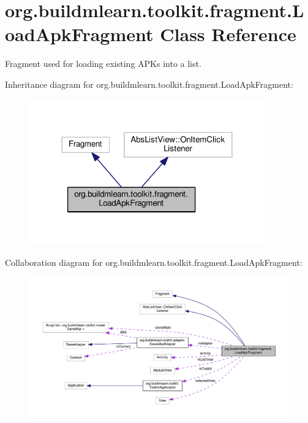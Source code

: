 \hypertarget{classorg_1_1buildmlearn_1_1toolkit_1_1fragment_1_1LoadApkFragment}{}\section{org.\+buildmlearn.\+toolkit.\+fragment.\+Load\+Apk\+Fragment Class Reference}
\label{classorg_1_1buildmlearn_1_1toolkit_1_1fragment_1_1LoadApkFragment}


Fragment used for loading existing A\+P\+Ks into a list.  




Inheritance diagram for org.\+buildmlearn.\+toolkit.\+fragment.\+Load\+Apk\+Fragment\+:
\nopagebreak
\begin{figure}[H]
\begin{center}
\leavevmode
\includegraphics[width=288pt]{classorg_1_1buildmlearn_1_1toolkit_1_1fragment_1_1LoadApkFragment__inherit__graph}
\end{center}
\end{figure}


Collaboration diagram for org.\+buildmlearn.\+toolkit.\+fragment.\+Load\+Apk\+Fragment\+:
\nopagebreak
\begin{figure}[H]
\begin{center}
\leavevmode
\includegraphics[width=350pt]{classorg_1_1buildmlearn_1_1toolkit_1_1fragment_1_1LoadApkFragment__coll__graph}
\end{center}
\end{figure}
